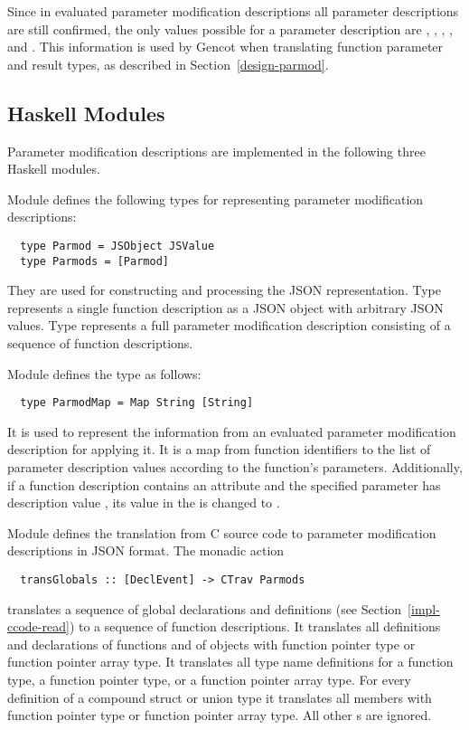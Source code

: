 Since in evaluated parameter modification descriptions all parameter descriptions are still confirmed, the only values
possible for a parameter description are , , , , and .
This information is used by Gencot when translating function parameter and result types, as described in Section~\ref{design-parmod}.

\subsection{Haskell Modules}
\label{impl-parmod-modules}

Parameter modification descriptions are implemented in the following three Haskell modules.

Module  defines the following types for representing parameter modification descriptions:
\begin{verbatim}
  type Parmod = JSObject JSValue
  type Parmods = [Parmod]
\end{verbatim}
They are used for constructing and processing the JSON representation. Type  represents a single
function description as a JSON object with arbitrary JSON values. Type  represents a full parameter modification
description consisting of a sequence of function descriptions.

Module  defines the type  as follows:
\begin{verbatim}
  type ParmodMap = Map String [String]
\end{verbatim}
It is used to represent the information from an evaluated parameter modification description for 
applying it. It is a map from function identifiers to the list of parameter description values according to the function's
parameters. Additionally, if a function description contains an attribute  and the specified parameter
has description value , its value in the  is changed to .

Module  defines the translation from C source code to parameter modification descriptions
in JSON format. The monadic action
\begin{verbatim}
  transGlobals :: [DeclEvent] -> CTrav Parmods
\end{verbatim}
translates a sequence of global declarations and definitions (see Section~\ref{impl-ccode-read}) to a sequence of
function descriptions. It translates all definitions and declarations of functions and of objects with function pointer
type or function pointer array type. It translates all type name definitions for a function type, a function pointer type, 
or a function pointer array type.
For every definition of a compound struct or union type it translates all members with function pointer type or function 
pointer array type.
All other s are ignored.

